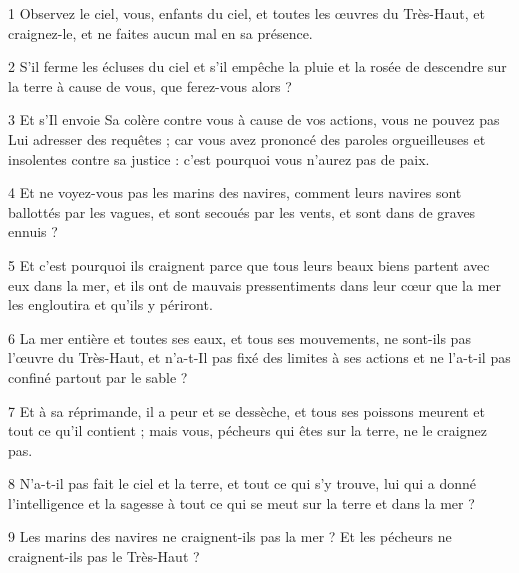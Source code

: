 
\par 1 Observez le ciel, vous, enfants du ciel, et toutes les œuvres du Très-Haut, et craignez-le, et ne faites aucun mal en sa présence.
\par 2 S'il ferme les écluses du ciel et s'il empêche la pluie et la rosée de descendre sur la terre à cause de vous, que ferez-vous alors ?
\par 3 Et s'Il envoie Sa colère contre vous à cause de vos actions, vous ne pouvez pas Lui adresser des requêtes ; car vous avez prononcé des paroles orgueilleuses et insolentes contre sa justice : c'est pourquoi vous n'aurez pas de paix.
\par 4 Et ne voyez-vous pas les marins des navires, comment leurs navires sont ballottés par les vagues, et sont secoués par les vents, et sont dans de graves ennuis ?
\par 5 Et c'est pourquoi ils craignent parce que tous leurs beaux biens partent avec eux dans la mer, et ils ont de mauvais pressentiments dans leur cœur que la mer les engloutira et qu'ils y périront.
\par 6 La mer entière et toutes ses eaux, et tous ses mouvements, ne sont-ils pas l'œuvre du Très-Haut, et n'a-t-Il pas fixé des limites à ses actions et ne l'a-t-il pas confiné partout par le sable ?
\par 7 Et à sa réprimande, il a peur et se dessèche, et tous ses poissons meurent et tout ce qu'il contient ; mais vous, pécheurs qui êtes sur la terre, ne le craignez pas.
\par 8 N'a-t-il pas fait le ciel et la terre, et tout ce qui s'y trouve, lui qui a donné l'intelligence et la sagesse à tout ce qui se meut sur la terre et dans la mer ?
\par 9 Les marins des navires ne craignent-ils pas la mer ? Et les pécheurs ne craignent-ils pas le Très-Haut ?


